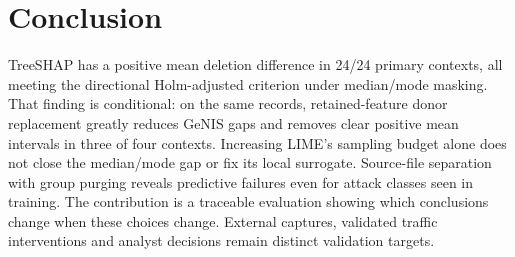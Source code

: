 \documentclass[conference,letterpaper]{IEEEtran}
\begin{document}
\section{Conclusion}
TreeSHAP has a positive mean deletion difference in 24/24 primary contexts, all meeting the directional Holm-adjusted criterion under median/mode masking. That finding is conditional: on the same records, retained-feature donor replacement greatly reduces GeNIS gaps and removes clear positive mean intervals in three of four contexts. Increasing LIME's sampling budget alone does not close the median/mode gap or fix its local surrogate. Source-file separation with group purging reveals predictive failures even for attack classes seen in training. The contribution is a traceable evaluation showing which conclusions change when these choices change. External captures, validated traffic interventions and analyst decisions remain distinct validation targets.
\end{document}
